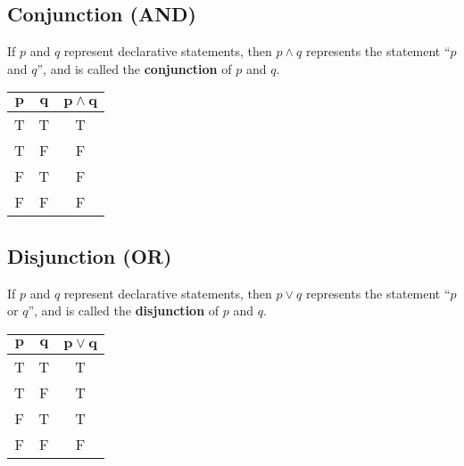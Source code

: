 \documentclass[../notes.tex]{subfiles}
\begin{document}
			\subsection[Conjunction]{Conjunction (AND)}
				If $p$ and $q$ represent declarative statements, then $p \land q$ represents the statement ``$p$ and $q$'', and is called the \textbf{conjunction} of $p$ and $q$.
				\begin{center}
					\begin{tabular}{|c c | c|}
						\hline
						$\mathbf{p}$ & $\mathbf{q}$ & $\mathbf{p \land q}$\\
						\hline
						T & T & T\\
						T & F & F\\
						F & T & F\\
						F & F & F\\
						\hline
					\end{tabular}	
				\end{center}
			\subsection[Disjunction]{Disjunction (OR)}
				If $p$ and $q$ represent declarative statements, then $p \lor q$ represents the statement ``$p$ or $q$'', and is called the \textbf{disjunction} of $p$ and $q$.
				\begin{center}
					\begin{tabular}{|c c | c|}
						\hline
						$\mathbf{p}$ & $\mathbf{q}$ & $\mathbf{p \lor q}$\\
						\hline
						T & T & T\\
						T & F & T\\
						F & T & T\\
						F & F & F\\
						\hline
					\end{tabular}	
				\end{center}
\end{document}
